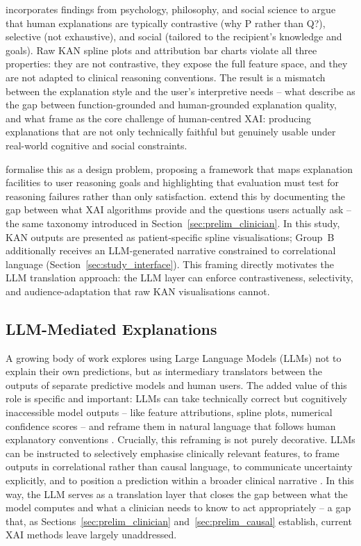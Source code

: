 \documentclass[12pt, a4paper]{article}
\begin{document}
\citet{miller2019explanation} incorporates findings from psychology, philosophy,
and social science to argue that human explanations are typically
contrastive (why P rather than Q?), selective (not exhaustive),
and social (tailored to the recipient's knowledge and goals). Raw KAN
spline plots and attribution bar charts violate all three properties: they are
not contrastive, they expose the full feature space, and they are not adapted
to clinical reasoning conventions. The result is a mismatch between the
explanation style and the user's interpretive needs -- what \citet{doshivelez2017rigorous}
describe as the gap between function-grounded and human-grounded explanation
quality, and what \citet{liaovarshney2021human} frame as the core challenge
of human-centred XAI: producing explanations that are not only technically
faithful but genuinely usable under real-world cognitive and social constraints.

\citet{wang2019designing} formalise this as a design problem, proposing a
framework that maps explanation facilities to user reasoning goals and
highlighting that evaluation must test for reasoning failures rather than only
satisfaction. \citet{liao2020questioning} extend this by documenting the gap
between what XAI algorithms provide and the questions users actually ask
-- the same taxonomy introduced in Section~\ref{sec:prelim_clinician}.
In this study, KAN outputs are presented as patient-specific spline
visualisations; Group~B additionally receives an LLM-generated narrative
constrained to correlational language (Section~\ref{sec:study_interface}).
This framing
directly motivates the LLM translation approach: the LLM layer can enforce
contrastiveness, selectivity, and audience-adaptation that raw KAN
visualisations cannot.

\subsection{LLM-Mediated Explanations}
\label{sec:prelim_llm}

A growing body of work explores using Large Language Models (LLMs) not to
explain their own predictions, but as intermediary translators between the
outputs of separate predictive models and human users. The added value of
this role is specific and important: LLMs can take technically correct but
cognitively inaccessible model outputs -- like feature attributions, spline
plots, numerical confidence scores -- and reframe them in natural language
that follows human explanatory conventions \citep{miller2019explanation}.
Crucially, this reframing is not purely decorative. LLMs can be instructed
to selectively emphasise clinically relevant features, to frame outputs
in correlational rather than causal language, to communicate uncertainty
explicitly, and to position a prediction within a broader clinical
narrative \citep{lee2025prompt, dams2025tell}. In this way, the LLM
serves as a translation layer that closes the gap between what the
model computes and what a clinician needs to know to act appropriately
-- a gap that, as Sections~\ref{sec:prelim_clinician}
and~\ref{sec:prelim_causal} establish, current XAI methods leave
largely unaddressed.
\end{document}
